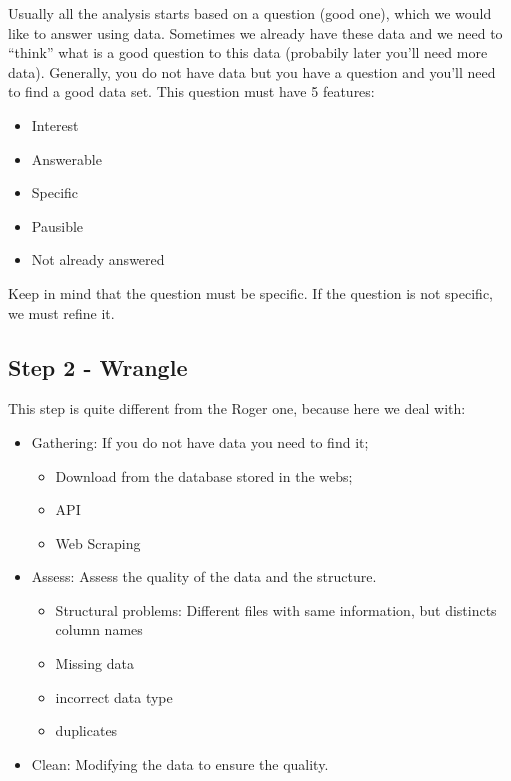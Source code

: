 \documentclass[]{book}
\providecommand{\tightlist}{%
  \setlength{\itemsep}{0pt}\setlength{\parskip}{0pt}}
\begin{document}
Usually all the analysis starts based on a question (good one), which we
would like to answer using data. Sometimes we already have these data
and we need to ``think'' what is a good question to this data (probabily
later you'll need more data). Generally, you do not have data but you
have a question and you'll need to find a good data set. This question
must have 5 features:

\begin{itemize}
\tightlist
\item
  Interest
\item
  Answerable
\item
  Specific
\item
  Pausible
\item
  Not already answered
\end{itemize}

Keep in mind that the question must be specific. If the question is not
specific, we must refine it.

\subsection{Step 2 - Wrangle}\label{step-2---wrangle}

This step is quite different from the Roger one, because here we deal
with:

\begin{itemize}
\tightlist
\item
  Gathering: If you do not have data you need to find it;

  \begin{itemize}
  \tightlist
  \item
    Download from the database stored in the webs;
  \item
    API
  \item
    Web Scraping
  \end{itemize}
\item
  Assess: Assess the quality of the data and the structure.

  \begin{itemize}
  \tightlist
  \item
    Structural problems: Different files with same information, but
    distincts column names
  \item
    Missing data
  \item
    incorrect data type
  \item
    duplicates
  \end{itemize}
\item
  Clean: Modifying the data to ensure the quality.
\end{itemize}
\end{document}
